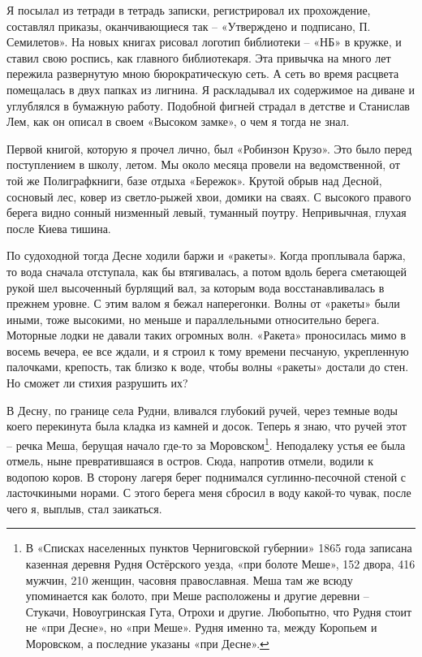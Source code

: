 Я посылал из тетради в тетрадь записки, регистрировал их прохождение, составлял приказы, оканчивающиеся так – «Утверждено и подписано, П. Семилетов». На новых книгах рисовал логотип библиотеки – «НБ» в кружке, и ставил свою роспись, как главного библиотекаря. Эта привычка на много лет пережила развернутую мною бюрократическую сеть. А сеть во время расцвета помещалась в двух папках из лигнина. Я раскладывал их содержимое на диване и углублялся в бумажную работу. Подобной фигней страдал в детстве и Станислав Лем, как он описал в своем «Высоком замке», о чем я тогда не знал.

Первой книгой, которую я прочел лично, был «Робинзон Крузо». Это было перед поступлением в школу, летом. Мы около месяца провели на ведомственной, от той же Полиграфкниги, базе отдыха «Бережок». Крутой обрыв над Десной, сосновый лес, ковер из светло-рыжей хвои, домики на сваях. С высокого правого берега видно сонный низменный левый, туманный поутру. Непривычная, глухая после Киева тишина. 

По судоходной тогда Десне ходили баржи и «ракеты». Когда проплывала баржа, то вода сначала отступала, как бы втягивалась, а потом вдоль берега сметающей рукой шел высоченный бурлящий вал, за которым вода восстанавливалась в прежнем уровне. С этим валом я бежал наперегонки. Волны от «ракеты» были иными, тоже высокими, но меньше и параллельными относительно берега. Моторные лодки не давали таких огромных волн. «Ракета» проносилась мимо в восемь вечера, ее все ждали, и я строил к тому времени песчаную, укрепленную палочками, крепость, так близко к воде, чтобы волны «ракеты» достали до стен. Но сможет ли стихия разрушить их?

В Десну, по границе села Рудни, вливался глубокий ручей, через темные воды коего перекинута была кладка из камней и досок. Теперь я знаю, что ручей этот – речка Меша, берущая начало где-то за Моровском\footnote{В «Списках населенных пунктов Черниговской губернии» 1865 года записана казенная деревня Рудня Остёрского уезда, «при болоте Меше», 152 двора, 416 мужчин, 210 женщин, часовня православная. Меша там же всюду упоминается как болото, при Меше расположены и другие деревни – Стукачи, Новоугринская Гута, Отрохи и другие. Любопытно, что Рудня стоит не «при Десне», но «при Меше». Рудня именно та, между Коропьем и Моровском, а последние указаны «при Десне».}. Неподалеку устья ее была отмель, ныне превратившаяся в остров. Сюда, напротив отмели, водили к водопою коров. В сторону лагеря берег поднимался суглинно-песочной стеной с ласточкиными норами. С этого берега меня сбросил в воду какой-то чувак, после чего я, выплыв, стал заикаться.

